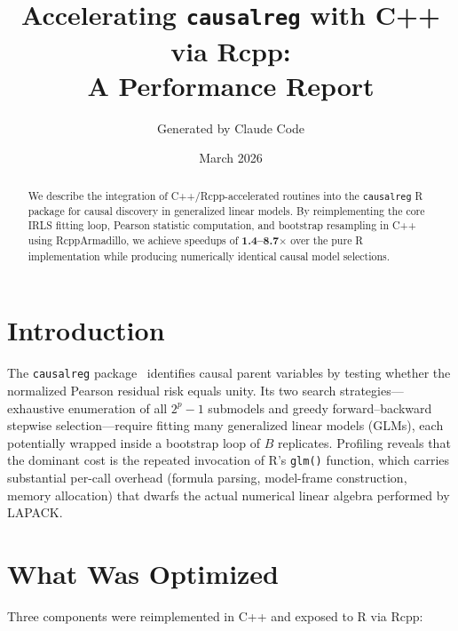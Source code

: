 \documentclass[11pt,a4paper]{article}
\title{Accelerating \texttt{causalreg} with C++ via Rcpp:\\
       A Performance Report}
\author{Generated by Claude Code}
\date{March 2026}
\begin{document}
\maketitle

\begin{abstract}
We describe the integration of C++/Rcpp-accelerated routines into the
\texttt{causalreg} R package for causal discovery in generalized linear models.
By reimplementing the core IRLS fitting loop, Pearson statistic computation,
and bootstrap resampling in C++ using RcppArmadillo, we achieve speedups of
\textbf{1.4--8.7$\times$} over the pure R implementation while producing
numerically identical causal model selections.
\end{abstract}

\section{Introduction}

The \texttt{causalreg} package~\cite{polinelli2026} identifies causal parent
variables by testing whether the normalized Pearson residual risk equals unity.
Its two search strategies---exhaustive enumeration of all $2^p - 1$ submodels
and greedy forward--backward stepwise selection---require fitting many
generalized linear models (GLMs), each potentially wrapped inside a bootstrap
loop of $B$ replicates.  Profiling reveals that the dominant cost is the
repeated invocation of R's \texttt{glm()} function, which carries substantial
per-call overhead (formula parsing, model-frame construction, memory
allocation) that dwarfs the actual numerical linear algebra performed by LAPACK.

\section{What Was Optimized}

Three components were reimplemented in C++ and exposed to R via Rcpp:
\end{document}
